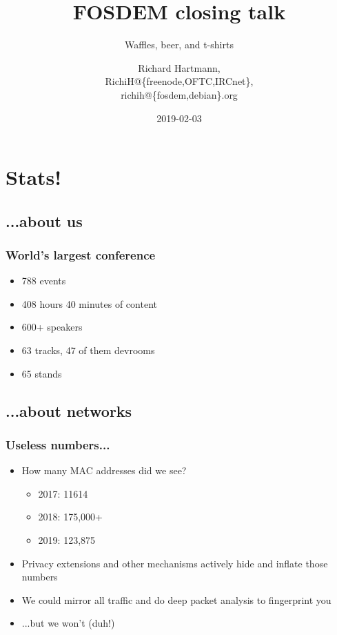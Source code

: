 \documentclass[aspectratio=169]{beamer}
\title{FOSDEM closing talk}
\subtitle{Waffles, beer, and t-shirts}
\author{Richard Hartmann,\\
RichiH@\{freenode,OFTC,IRCnet\},\\
richih@\{fosdem,debian\}.org}
\date{2019-02-03}
\begin{document}
\setcounter{tocdepth}{1}

\begin{frame}
	\titlepage
\end{frame}




\section{Stats!}

\subsection{...about us}

\begin{frame}
	\frametitle{World's largest conference}
	\vfill
	\begin{itemize}
		\item 788 events
		\item 408 hours 40 minutes of content
		\item 600+ speakers
		\item 63 tracks, 47 of them devrooms
		\item 65 stands
	\end{itemize}
	\vfill
\end{frame}

\subsection{...about networks}

\begin{frame}
	\frametitle{Useless numbers...}
	\vfill
	\begin{itemize}
		\item How many MAC addresses did we see?
		\begin{itemize}
			\item 2017: 11614
			\item 2018: 175,000+
			\item 2019: 123,875
		\end{itemize}
		\item Privacy extensions and other mechanisms actively hide and inflate those numbers
		\item We could mirror all traffic and do deep packet analysis to fingerprint you
		\item ...but we won't (duh!)
	\end{itemize}
	\vfill
\end{frame}
\end{document}
